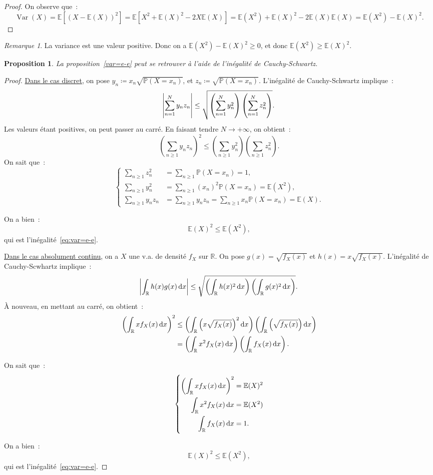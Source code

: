\documentclass{article}
\newcommand{\E}{\mathbb E}
\renewcommand{\P}{\mathbb P}
\newcommand{\R}{\mathbb R}
\DeclareMathOperator{\Var}{Var}
\newtheorem{prp}[thm]{Proposition}
\theoremstyle{definition}
\theoremstyle{remark}
\newtheorem*{rmq}{Remarque}
\begin{document}
		\begin{proof} On observe que~:
		\[\Var(X) = \E\left[(X-\E(X))^2\right] = \E\left[X^2 + \E(X)^2 - 2X\E(X)\right] = \E(X^2) + \E(X)^2 - 2\E(X)\E(X) = \E(X^2) - \E(X)^2.\]
		\end{proof}

		\begin{rmq} La variance est une valeur positive. Donc on a $\E(X^2) - \E(X)^2 \geq 0$, et donc $\E(X^2) \geq \E(X)^2$. \end{rmq}

		\begin{prp} La proposition~\ref{var=e-e} peut se retrouver à l'aide de l'inégalité de Cauchy-Schwartz. \end{prp}

		\begin{proof} \underline{Dans le cas discret}, on pose $y_n \coloneqq x_n\sqrt{\P(X=x_n)}$, et $z_n \coloneqq \sqrt{\P(X=x_n)}$. L'inégalité de
		Cauchy-Schwartz implique~:
		\[\abs {\sum_{n=1}^Ny_nz_n} \leq \sqrt{\left(\sum_{n=1}^Ny_n^2\right) \left(\sum_{n=1}^Nz_n^2\right)}.\]
		Les valeurs étant positives, on peut passer au carré. En faisant tendre $N \to +\infty$, on obtient~:
		\[\left(\sum_{n \geq 1}y_nz_n\right)^2 \leq \left(\sum_{n \geq 1}y_n^2\right) \left(\sum_{n \geq 1}z_n^2\right).\]
		On sait que~:
		\[
			\left\{\begin{aligned}
				\sum_{n \geq 1}z_n^2 &= \sum_{n \geq 1}\P(X = x_n) = 1, \\
				\sum_{n \geq 1}y_n^2 &= \sum_{n \geq 1}(x_n)^2\P(X = x_n) = \E(X^2), \\
				\sum_{n \geq 1}y_nz_n &= \sum_{n \geq 1}y_nz_n = \sum_{n \geq 1}x_n\P(X = x_n) = \E(X).
			\end{aligned}\right.
		\]

		On a bien~:
		\[\E(X)^2 \leq \E(X^2),\]
		qui est l'inégalité~\eqref{eq:var=e-e}.

		\underline{Dans le cas absolument continu}, on a $X$ une v.a. de densité $f_X$ sur $\R$. On pose $g(x) = \sqrt{f_X(x)}$ et $h(x) = x\sqrt{f_X(x)}$.
		L'inégalité de Cauchy-Scwhartz implique~:
		\[\abs{\int_\R h(x)g(x)\dif x} \leq \sqrt {\left(\int_\R h(x)^2 \dif x\right) \left(\int_\R g(x)^2 \dif x\right)}.\]
		À nouveau, en mettant au carré, on obtient~:
		\begin{align*}
			\left(\int_\R xf_X(x)\dif x\right)^2 &\leq \left(\int_\R \left(x\sqrt{f_X(x)}\right)^2\dif x\right) \left(\int_\R\left(\sqrt{f_X(x)}\right)\dif x\right) \\
			&= \left(\int_\R x^2f_X(x)\dif x\right) \left(\int_\R f_X(x)\dif x\right).
		\end{align*}

		On sait que~:
		\[
			\left\{\begin{aligned}
				\left(\int_\R xf_X(x)\dif x\right)^2 &= \E(X)^2 \\
				\int_\R x^2f_X(x)\dif x &= \E(X^2) \\
				\int_\R f_X(x)\dif x &= 1.
			\end{aligned}\right.
		\]

		On a bien~:
		\[\E(X)^2 \leq \E(X^2),\]
		qui est l'inégalité~\eqref{eq:var=e-e}.
		\end{proof}
\end{document}
